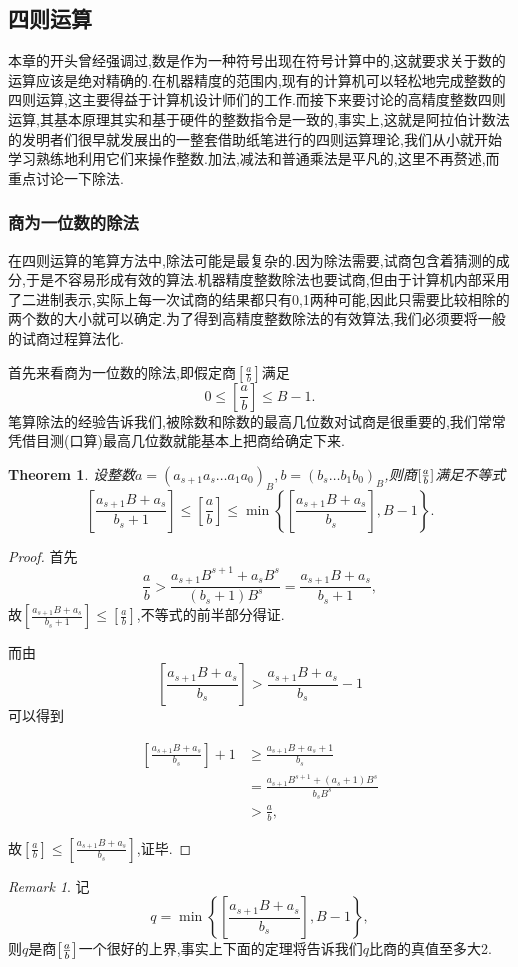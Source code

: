 \documentclass{ctexart}
\newtheorem{theorem}{Theorem}
\theoremstyle{remark}
\newtheorem{remark}{Remark}
\theoremstyle{definition}
\newtheorem{proof}{Proof}
\begin{document}
\subsection{四则运算}

本章的开头曾经强调过,数是作为一种符号出现在符号计算中的,这就要求关于数的运算应该是绝对精确的.在机器精度的范围内,现有的计算机可以轻松地完成整数的四则运算,这主要得益于计算机设计师们的工作.而接下来要讨论的高精度整数四则运算,其基本原理其实和基于硬件的整数指令是一致的,事实上,这就是阿拉伯计数法的发明者们很早就发展出的一整套借助纸笔进行的四则运算理论,我们从小就开始学习熟练地利用它们来操作整数.加法,减法和普通乘法是平凡的,这里不再赘述,而重点讨论一下除法.

\subsubsection{商为一位数的除法}
在四则运算的笔算方法中,除法可能是最复杂的.因为除法需要,试商包含着猜测的成分,于是不容易形成有效的算法.机器精度整数除法也要试商,但由于计算机内部采用了二进制表示,实际上每一次试商的结果都只有0,1两种可能,因此只需要比较相除的两个数的大小就可以确定.为了得到高精度整数除法的有效算法,我们必须要将一般的试商过程算法化.

首先来看商为一位数的除法,即假定商$\left[\frac{a}{b}\right]$满足$$0\le\left[\frac{a}{b}\right]\le B-1.$$笔算除法的经验告诉我们,被除数和除数的最高几位数对试商是很重要的,我们常常凭借目测(口算)最高几位数就能基本上把商给确定下来.

\begin{theorem}\label{th:division1}
设整数$a=(a_{s+1}a_s\ldots a_1a_0)_B,b=(b_s\ldots b_1b_0)_B$,则商$[{a\over b}]$满足不等式
$$\left[\frac{a_{s+1}B+a_s}{b_s+1}\right]\le\left[\frac{a}{b}\right]\le\min\left\{\left[\frac{a_{s+1}B+a_s}{b_s}\right],B-1\right\}.$$
\end{theorem}
\begin{proof}
首先$$\frac{a}{b}>\frac{a_{s+1}B^{s+1}+a_sB^s}{(b_s+1)B^s}=\frac{a_{s+1}B+a_s}{b_s+1},$$故$\left[\frac{a_{s+1}B+a_s}{b_s+1}\right] \le \left[\frac{a}{b}\right]$,不等式的前半部分得证.

而由$$\left[\frac{a_{s+1}B+a_s}{b_s}\right] > \frac{a_{s+1}B+a_s}{b_s}-1$$可以得到

\begin{align*}
  \left[\frac{a_{s+1}B+a_s}{b_s}\right]+1&\ge\frac{a_{s+1}B+a_s+1}{b_s}\\
&=\frac{a_{s+1}B^{s+1}+(a_s+1)B^s}{b_sB^s}\\
&>\frac{a}{b},
\end{align*}

故$\left[\frac{a}{b}\right]\le\left[\frac{a_{s+1}B+a_s}{b_s}\right]$,证毕.
\end{proof}
\begin{remark}
记$$q = \min\left\{\left[\frac{a_{s+1}B+a_s}{b_s}\right],B-1\right\},$$则$q$是商$\left[{a\over b}\right]$一个很好的上界,事实上下面的定理将告诉我们$q$比商的真值至多大2.
\end{remark}
\end{document}
